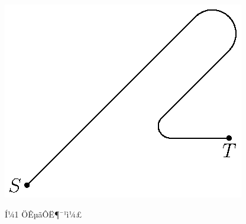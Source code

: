 \documentclass[A4,twoside]{ctexart}
\begin{document}


\newpage
\vspace*{5mm}
\centerline{\includegraphics[viewport=234 339 377 452,clip]{nonhol}}
\vskip 2mm
\centerline{{\footnotesize Í¼1 \quad ÖÊµãÔË¶¯¹ì¼£}}
\baselineskip
\end{document}
